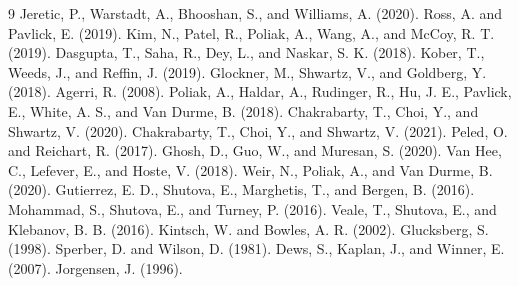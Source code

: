 \documentclass[12pt]{article}
\begin{document}
\begin{thebibliography}{9}
 Jeretic, P., Warstadt, A., Bhooshan, S., and Williams, A. (2020).
 Ross, A. and Pavlick, E. (2019).
 Kim, N., Patel, R., Poliak, A., Wang, A., and McCoy, R. T. (2019).
 Dasgupta, T., Saha, R., Dey, L., and Naskar, S. K. (2018).
 Kober, T., Weeds, J., and Reffin, J. (2019).
 Glockner, M., Shwartz, V., and Goldberg, Y. (2018).
 Agerri, R. (2008).
 Poliak, A., Haldar, A., Rudinger, R., Hu, J. E., Pavlick, E., White, A. S., and Van Durme, B. (2018).
 Chakrabarty, T., Choi, Y., and Shwartz, V. (2020).
 Chakrabarty, T., Choi, Y., and Shwartz, V. (2021).
 Peled, O. and Reichart, R. (2017).
 Ghosh, D., Guo, W., and Muresan, S. (2020).
 Van Hee, C., Lefever, E., and Hoste, V. (2018).
 Weir, N., Poliak, A., and Van Durme, B. (2020).
 Gutierrez, E. D., Shutova, E., Marghetis, T., and Bergen, B. (2016).
 Mohammad, S., Shutova, E., and Turney, P. (2016).
 Veale, T., Shutova, E., and Klebanov, B. B. (2016).
 Kintsch, W. and Bowles, A. R. (2002).
 Glucksberg, S. (1998).
 Sperber, D. and Wilson, D. (1981).
 Dews, S., Kaplan, J., and Winner, E. (2007).
 Jorgensen, J. (1996).
\end{thebibliography}
\end{document}

